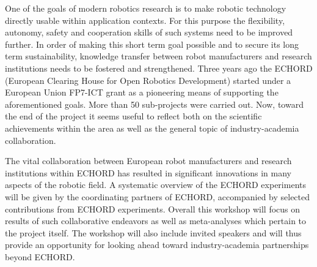 \begin{spacing}{1.0}
{One of the goals of modern robotics research is to make robotic technology directly usable within application contexts. For this purpose the flexibility, autonomy, safety and cooperation skills of such systems need to be improved further. In order of making this short term goal possible and to secure its long term sustainability, knowledge transfer between robot manufacturers and research institutions needs to be fostered and strengthened. Three years ago the ECHORD (European Clearing House for Open Robotics Development) started under a European Union FP7-ICT grant as a pioneering means of supporting the aforementioned goals. More than 50 sub-projects were carried out. Now, toward the end of the project it seems useful to reflect both on the scientific achievements within the area as well as the general topic of industry-academia collaboration.

The vital collaboration between European robot manufacturers and research institutions within ECHORD has resulted in significant innovations in many aspects of the robotic field. A systematic overview of the ECHORD experiments will be given by the coordinating partners of ECHORD, accompanied by selected contributions from ECHORD experiments. Overall this workshop will focus on results of such collaborative endeavors as well as meta-analyses which pertain to the project itself. The workshop will also include invited speakers and will thus provide an opportunity for looking ahead toward industry-academia partnerships beyond ECHORD.
}

\clearpage


\end{spacing}
